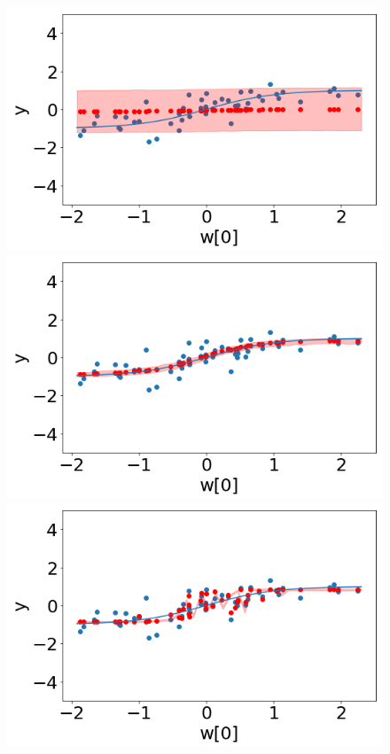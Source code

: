 \begin{figure}
 \begin{minipage}[]{.3\textwidth}
    \includegraphics[width=\textwidth]{plots/experiment_structures/plot_1kld.png}
\subcaption{}
\end{minipage}
 \begin{minipage}{.3\textwidth}
    \includegraphics[width=\textwidth]{plots/experiment_structures/plot_1elbo.png}
\subcaption{}
\end{minipage}
 \begin{minipage}{.3\textwidth}
    \includegraphics[width=\textwidth]{plots/experiment_structures/plot_1overfit.png}
\subcaption{}
\end{minipage}



\end{figure}
